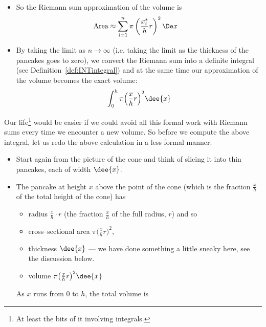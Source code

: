 \begin{eg}[Cone]
\begin{itemize}
\item So the Riemann sum approximation of the volume is
\begin{align*}
  \text{Area} &\approx \sum_{i=1}^n  \pi \left( \frac{x_i^*}{h}r\right)^2 \De x
\end{align*}
\item By taking the limit as $n \to \infty$ (i.e. taking the limit as the thickness of
the pancakes goes to zero), we convert the Riemann sum into a definite integral (see
Definition~\ref{def:INTintegral}) and at the same time our approximation of the volume
becomes the exact volume:
\begin{align*}
\int_0^h \pi \Big(\frac{x}{h}r\Big)^2\dee{x}
\end{align*}
\end{itemize}
Our life\footnote{At least the bits of it involving integrals.} would be easier if
we could avoid all this formal work with Riemann sums every time we encounter a new
volume. So before we compute the above integral, let us redo the above calculation in a
less formal manner.
\begin{itemize}
 \item Start again from the picture of the cone
and think of slicing it into thin pancakes, each of width $\dee{x}$.
\item The pancake at height $x$ above the point of the cone (which is the fraction
$\frac{x}{h}$ of the total height of the cone) has
\begin{itemize}
\item radius $\frac{x}{h}\cdot r$ (the fraction $\frac{x}{h}$ of the
full radius, $r$) and so
\item cross--sectional area $\pi \big(\frac{x}{h}r\big)^2$,
\item thickness $\dee{x}$ --- we have done something a little sneaky here, see the
discussion below.
\item volume $\pi \big(\frac{x}{h}r\big)^2\dee{x}$
\end{itemize}
As $x$ runs from $0$ to $h$, the total volume is

\end{itemize}
\end{eg}

